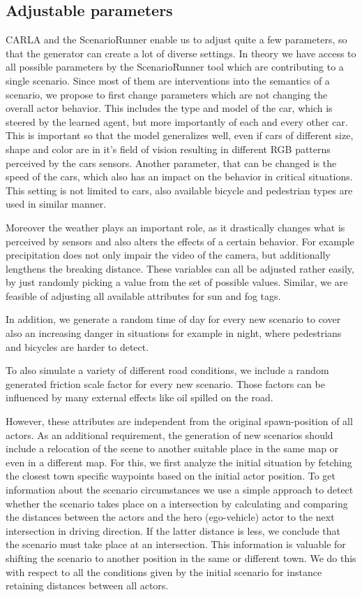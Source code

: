 \documentclass[conference, 11pt]{IEEEtran}
\begin{document}
\subsection{Adjustable parameters}

CARLA and the ScenarioRunner enable us to adjust quite a few parameters, so that the generator can create a lot of diverse settings. In theory we have access to all possible parameters by the ScenarioRunner tool which are contributing to a single scenario. Since most of them are interventions into the semantics of a scenario, we propose to first change parameters which are not changing the overall actor behavior.
This includes the type and model of the car, which is steered by the learned agent, but more importantly of each and every other car.
This is important so that the model generalizes well, even if cars of different size, shape and color are in it's field of vision resulting in different RGB patterns perceived by the cars sensors.
Another parameter, that can be changed is the speed of the cars, which also has an impact on the behavior in critical situations.
This setting is not limited to cars, also available bicycle and pedestrian types are used in similar manner.

Moreover the weather plays an important role, as it drastically changes what is perceived by sensors and also alters the effects of a certain behavior. For example precipitation does not only impair the video of the camera, but additionally lengthens the breaking distance.
These variables can all be adjusted rather easily, by just randomly picking a value from the set of possible values.
Similar, we are feasible of adjusting all available attributes for sun and fog tags.

In addition, we generate a random time of day for every new scenario to cover also an increasing danger in situations for example in night, where pedestrians and bicycles are harder to detect.

To also simulate a variety of different road conditions, we include a random generated friction scale factor for every new scenario. Those factors can be influenced by many external effects like oil spilled on the road.

However, these attributes are independent from the original spawn-position of all actors. As an additional requirement, the generation of new scenarios should include a relocation of the scene to another suitable place in 
the same map or even in a different map.
For this, we first analyze the initial situation by fetching the closest town specific waypoints based on the initial actor position. To get information about the scenario circumstances we use a simple approach to detect whether the scenario takes place on a intersection by calculating and comparing the distances between the actors and the hero (ego-vehicle) actor to the next intersection in driving direction. If the latter distance is less, we conclude that the scenario must take place at an intersection. This information is valuable for shifting the scenario to another  position in the same or different town. We do this with respect to all the conditions given by the initial scenario for instance retaining distances between all actors.
\end{document}
